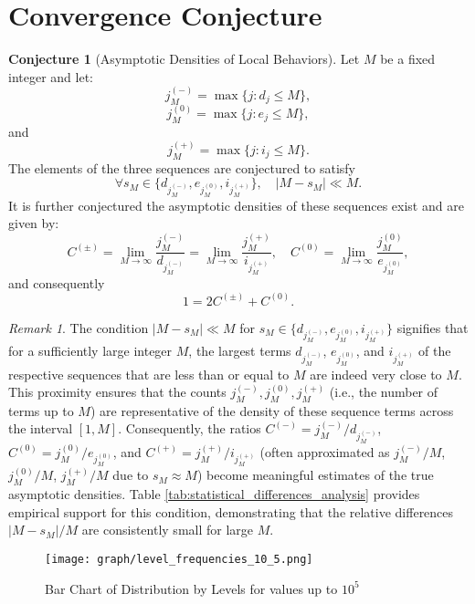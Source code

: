 \documentclass[]{article}
\theoremstyle{plain}%
\theoremstyle{definition}
\newtheorem{conj}{Conjecture}[section]
\theoremstyle{remark}
\newtheorem*{rem}{Remark}
\begin{document}
	\section {Convergence Conjecture}
	\begin{conj}[Asymptotic Densities of Local Behaviors]
		\label{conj:ratios}
		Let $M$ be a fixed integer and let:
		$$ j^{(-)}_M = \max \{ j :  d_j\le M\},$$
		$$ j^{(0)}_M = \max \{ j :  e_j\le M\},$$
		and
		$$ j^{(+)}_M = \max \{ j :  i_j\le M\}.$$
		The elements of the three sequences are conjectured to satisfy
		$$   \forall s_M \in \{d_{j^{(-)}_M},e_{j^{(0)}_M},i_{j^{(+)}_M}\}, \quad |M-s_M| \ll M. $$
		It is further conjectured the asymptotic densities of these sequences exist and are given by:
		$$ C^{(\pm)} = \lim_{M \to \infty} \frac{j^{(-)}_M}{d_{j^{(-)}_M}} = \lim_{M \to \infty}\frac{j^{(+)}_M}{i_{j^{(+)}_M}}, \quad C^{(0)} = \lim_{M \to \infty} \frac{j^{(0)}_M}{e_{j^{(0)}_M}},$$
		and consequently
		$$ 1 = 2C^{(\pm)} +C^{(0)}.$$
	\end{conj}
	\begin{rem}
		The condition $ |M-s_M| \ll M $ for $ s_M \in \{d_{j^{(-)}_M},e_{j^{(0)}_M},i_{j^{(+)}_M}\} $ signifies that for a sufficiently large integer $M$, the largest terms $d_{j^{(-)}_M}$, $e_{j^{(0)}_M}$, and $i_{j^{(+)}_M}$ of the respective sequences that are less than or equal to $M$ are indeed very close to $M$. This proximity ensures that the counts $j^{(-)}_M, j^{(0)}_M, j^{(+)}_M$ (i.e., the number of terms up to $M$) are representative of the density of these sequence terms across the interval $[1, M]$. Consequently, the ratios $C^{(-)} = j^{(-)}_M/d_{j^{(-)}_M}$, $C^{(0)} = j^{(0)}_M/e_{j^{(0)}_M}$, and $C^{(+)} = j^{(+)}_M/i_{j^{(+)}_M}$ (often approximated as $j^{(-)}_M/M$, $j^{(0)}_M/M$, $j^{(+)}_M/M$ due to $s_M \approx M$) become meaningful estimates of the true asymptotic densities. Table \ref{tab:statistical_differences_analysis} provides empirical support for this condition, demonstrating that the relative differences $|M-s_M|/M$ are consistently small for large $M$.
	\end{rem}
	\begin{figure}[h]
		\caption{Bar Chart of Distribution by Levels for values up to $10^5$}
		\centering
		\texttt{[image: graph/level\_frequencies\_10\_5.png]}
	\end{figure}
\end{document}
